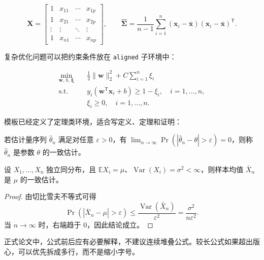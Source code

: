 \begin{equation}
  \mathbf{X}=
  \begin{bmatrix}
    1 & x_{11} & \cdots & x_{1p}\\
    1 & x_{21} & \cdots & x_{2p}\\
    \vdots & \vdots & \ddots & \vdots\\
    1 & x_{n1} & \cdots & x_{np}
  \end{bmatrix},
  \qquad
  \hat{\boldsymbol{\Sigma}}=\frac{1}{n-1}\sum_{i=1}^{n}
  (\mathbf{x}_i-\bar{\mathbf{x}})(\mathbf{x}_i-\bar{\mathbf{x}})^{\mathsf T}.
  \label{eq:matrix}
\end{equation}

复杂优化问题可以把约束条件放在 \texttt{aligned} 子环境中：

\begin{equation}
  \begin{aligned}
    \min_{\mathbf{w},\,b,\,\boldsymbol{\xi}}\quad
    & \frac{1}{2}\lVert\mathbf{w}\rVert_2^2+C\sum_{i=1}^{n}\xi_i\\
    \text{s.t.}\quad
    & y_i(\mathbf{w}^{\mathsf T}\mathbf{x}_i+b)\ge 1-\xi_i,\quad i=1,\ldots,n,\\
    & \xi_i\ge 0,\quad i=1,\ldots,n .
  \end{aligned}
  \label{eq:svm}
\end{equation}

模板已经定义了定理类环境，适合写定义、定理和证明：

\begin{definition}[一致估计]
若估计量序列 \(\hat{\theta}_n\) 满足对任意 \(\varepsilon>0\)，有
\(\lim_{n\to\infty}\Pr(|\hat{\theta}_n-\theta|>\varepsilon)=0\)，则称 \(\hat{\theta}_n\) 是参数 \(\theta\) 的一致估计。
\end{definition}

\begin{theorem}[样本均值的一致性]
设 \(X_1,\ldots,X_n\) 独立同分布，且 \(\mathbb{E}X_i=\mu\)、\(\operatorname{Var}(X_i)=\sigma^2<\infty\)，则样本均值 \(\bar{X}_n\) 是 \(\mu\) 的一致估计。
\end{theorem}

\begin{proof}
由切比雪夫不等式可得
\[
  \Pr(|\bar{X}_n-\mu|>\varepsilon)
  \le \frac{\operatorname{Var}(\bar{X}_n)}{\varepsilon^2}
  = \frac{\sigma^2}{n\varepsilon^2}.
\]
当 \(n\to\infty\) 时，右端趋于 0，因此结论成立。
\end{proof}

正式论文中，公式前后应有必要解释，不建议连续堆叠公式。较长公式如果超出版心，可以优先拆成多行，而不是缩小字号。

